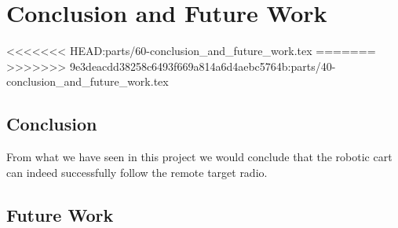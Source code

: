 \chapter{Conclusion and Future Work}
<<<<<<< HEAD:parts/60-conclusion_and_future_work.tex
\label{ch: Chapter6}
=======
\label{ch: conclusionAndFuture}
>>>>>>> 9e3deacdd38258c6493f669a814a6d4aebc5764b:parts/40-conclusion_and_future_work.tex

\section{Conclusion}

From what we have seen in this project we would conclude that the robotic cart can indeed successfully follow the remote target radio.


  

\section{Future Work}



